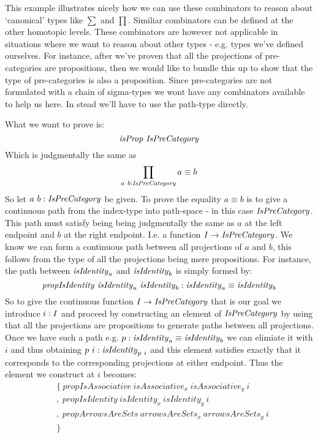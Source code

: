 This example illustrates nicely how we can use these combinators to reason about
`canonical' types like $\sum$ and $\prod$. Similiar combinators can be defined
at the other homotopic levels. These combinators are however not applicable in
situations where we want to reason about other types - e.g. types we've defined
ourselves. For instance, after we've proven that all the projections of
pre-categories are propositions, then we would like to bundle this up to show
that the type of pre-categories is also a proposition. Since pre-categories are
not formulated with a chain of sigma-types we wont have any combinators
available to help us here. In stead we'll have to use the path-type directly.

What we want to prove is:
%
$$
\isProp\ \IsPreCategory
$$
%
Which is judgmentally the same as
%
$$
\prod_{a\ b \mathrel{:} \mathit{IsPreCategory}} a \equiv b
$$
%
So let $a\ b \mathrel{:} \mathit{IsPreCategory}$ be given. To prove the equality $a \equiv b$ is
to give a continuous path from the index-type into path-space - in this case
$\mathit{IsPreCategory}$. This path must satisfy being being judgmentally the same as
$a$ at the left endpoint and $b$ at the right endpoint. I.e. a function $I \to
\mathit{IsPreCategory}$. We know we can form a continuous path between all projections
of $a$ and $b$, this follows from the type of all the projections being mere
propositions. For instance, the path between $\mathit{isIdentity}_a$ and $\mathit{isIdentity}_b$
is simply formed by:
%
$$
\mathit{propIsIdentity}\ \mathit{isIdentity}_a\ \mathit{isIdentity}_b \mathrel{:} \mathit{isIdentity}_a \equiv \mathit{isIdentity}_b
$$
%
So to give the continuous function $I \to \mathit{IsPreCategory}$ that is our goal we
introduce $i \mathrel{:} I$ and proceed by constructing an element of $\mathit{IsPreCategory}$
by using that all the projections are propositions to generate paths between all
projections. Once we have such a path e.g. $p \mathrel{:} \mathit{isIdentity}_a \equiv
\mathit{isIdentity}_b$ we can elimiate it with $i$ and thus obtaining $p\ i \mathrel{:}
\mathit{isIdentity}_{p\ i}$ and this element satisfies exactly that it corresponds to
the corresponding projections at either endpoint. Thus the element we construct
at $i$ becomes:
%
\begin{align*}
  & \{\ \mathit{propIsAssociative}\   \mathit{isAssociative}_x\
       \mathit{isAssociative}_y\ i  \\
  & ,\  \mathit{propIsIdentity}\      \mathit{isIdentity}_x\
       \mathit{isIdentity}_y\ i  \\
  & ,\  \mathit{propArrowsAreSets}\ \mathit{arrowsAreSets}_x\
       \mathit{arrowsAreSets}_y\ i  \\
  & \}
\end{align*}
